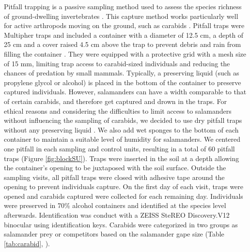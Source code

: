Pitfall trapping is a passive sampling method used to assess the species richness of ground-dwelling invertebrates \citep{knappEffectPitfallTrap2012,kotzeFortyYearsCarabid2011a,loveiEcologyBehaviorGround1996}.
This capture method works particularly well for active arthropods moving on the ground, such as carabids \citep{baarsCatchesPitfallTraps1979,loveiEcologyBehaviorGround1996,spenceSamplingCarabidAssemblages1994a}. 
Pitfall traps were Multipher\up{\textregistered{}} traps and included a container with a diameter of 12.5 cm, a depth of 25 cm and a cover raised 4.5 cm above the trap 
to prevent debris and rain from filling the container \citep{bouchardBeetleCommunityResponse2016b,mooreEffectsTwoSilvicultural2004}.
They were equipped with a protective grid with a mesh size of 15 mm, limiting trap access to carabid-sized individuals and reducing the chances of predation by small mammals. 
Typically, a preserving liquid (such as propylene glycol or alcohol) is placed in the bottom of the container to preserve captured individuals. 
However, salamanders can have a width comparable to that of certain carabids, and therefore get captured and drown in the traps. 
For ethical reasons and considering the difficulties to limit access to salamanders without influencing the sampling of carabids, we decided to use dry pitfall traps without any preserving liquid \citep{luffFeaturesInfluencingEfficiency1975}. 
We also add wet sponges to the bottom of each container to maintain a suitable level of humidity for salamanders.
We centered one pitfall in each sampling and control units, resulting in a total of 60 pitfall traps (Figure \ref{fig:blockSU}). 
Traps were inserted in the soil at a depth allowing the container's opening to be juxtaposed with the soil surface. 
Outside the sampling visits, all pitfall traps were closed with adhesive tape around the opening to prevent individuals capture. 
On the first day of each visit, traps were opened and carabids captured were collected for each remaining day. 
Individuals were preserved in 70\% alcohol containers and identified at the species level afterwards.
Identification was conduct with a ZEISS SteREO Discovery.V12 binocular using \cite{larochelleManuelIdentificationCarabidae1976} identification keys.
Carabids were categorized in two groups as salamander prey or competitors based on the salamander gape size (Table \ref{tab:carabid}, \citealp{jaegerFoodLimitedResource1972,magliaModulationPreycaptureBehavior1995,magliaOntogenyFeedingEcology1996}).

